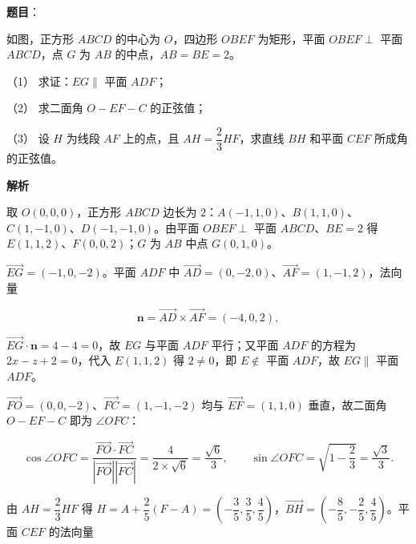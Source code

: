 \begin{answer}

\textbf{题目}：

如图，正方形 \(ABCD\) 的中心为 \(O\)，四边形 \(OBEF\) 为矩形，平面 \(OBEF\perp\) 平面 \(ABCD\)，点 \(G\) 为 \(AB\) 的中点，\(AB=BE=2\)。
\nopagebreak[4]
\begin{center}\end{center}
\nopagebreak[4]
（1） 求证：\(EG\parallel\) 平面 \(ADF\)；

（2） 求二面角 \(O-EF-C\) 的正弦值；

（3） 设 \(H\) 为线段 \(AF\) 上的点，且 \(AH=\dfrac{2}{3}HF\)，求直线 \(BH\) 和平面 \(CEF\) 所成角的正弦值。

\Needspace{0.48\textheight}

\textbf{解析}

取 \(O(0,0,0)\)，正方形 \(ABCD\) 边长为 \(2\)：\(A(-1,1,0)\)、\(B(1,1,0)\)、\(C(1,-1,0)\)、\(D(-1,-1,0)\)。由平面 \(OBEF\perp\) 平面 \(ABCD\)、\(BE=2\) 得 \(E(1,1,2)\)、\(F(0,0,2)\)；\(G\) 为 \(AB\) 中点 \(G(0,1,0)\)。


\(\overrightarrow{EG}=(-1,0,-2)\)。平面 \(ADF\) 中 \(\overrightarrow{AD}=(0,-2,0)\)、\(\overrightarrow{AF}=(1,-1,2)\)，法向量

\nopagebreak[4]
\[
\boldsymbol n=\overrightarrow{AD}\times\overrightarrow{AF}=(-4,0,2),
\]

\(\overrightarrow{EG}\cdot\boldsymbol n=4-4=0\)，故 \(EG\) 与平面 \(ADF\) 平行；又平面 \(ADF\) 的方程为 \(2x-z+2=0\)，代入 \(E(1,1,2)\) 得 \(2\neq0\)，即 \(E\notin\) 平面 \(ADF\)，故 \(EG\parallel\) 平面 \(ADF\)。


\(\overrightarrow{FO}=(0,0,-2)\)、\(\overrightarrow{FC}=(1,-1,-2)\) 均与 \(\overrightarrow{EF}=(1,1,0)\) 垂直，故二面角 \(O-EF-C\) 即为 \(\angle OFC\)：

\nopagebreak[4]
\[
\cos\angle OFC=\frac{\overrightarrow{FO}\cdot\overrightarrow{FC}}{|\overrightarrow{FO}||\overrightarrow{FC}|}=\frac{4}{2\times\sqrt{6}}=\frac{\sqrt{6}}{3},\qquad
\sin\angle OFC=\sqrt{1-\frac{2}{3}}=\frac{\sqrt{3}}{3}.
\]


由 \(AH=\dfrac{2}{3}HF\) 得 \(H=A+\dfrac{2}{5}(F-A)=\left(-\dfrac{3}{5},\dfrac{3}{5},\dfrac{4}{5}\right)\)，\(\overrightarrow{BH}=\left(-\dfrac{8}{5},-\dfrac{2}{5},\dfrac{4}{5}\right)\)。平面 \(CEF\) 的法向量


\end{answer}
